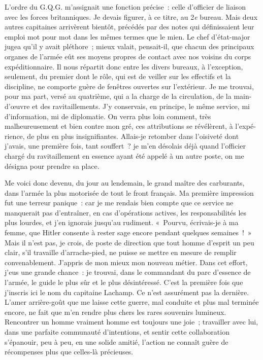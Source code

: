 \documentclass[french,twoside]{book} %
\begin{document}
L’ordre du G.Q.G. m’assignait une fonction précise : celle d’officier de liaison avec les forces britanniques. Je devais figurer, à ce titre, au 2\emph{e} bureau. Mais deux autres capitaines arrivèrent bientôt, pré­cédés par des notes qui définissaient leur emploi mot pour mot dans les mêmes termes que le mien. Le chef d’état-major jugea qu’il y avait   pléthore ; mieux valait, pensait-il, que chacun des principaux organes de l’armée eût ses moyens propres de contact avec nos voisins du corps expéditionnaire. Il nous répartit donc entre les divers bureaux, à l’exception, seulement, du premier dont le rôle, qui est de veiller sur les effectifs et la discipline, ne comporte guère de fenêtres ouvertes sur l’extérieur. Je me trouvai, pour ma part, versé au quatrième, qui a la charge de la circulation, de la main-d’œuvre et des ravitaille­ments. J’y conservais, en principe, le même service, mi d’information, mi de diplomatie. On verra plus loin comment, très malheureusement et bien contre mon gré, ces attributions se révélèrent, à l’expé­rience, de plus en plus insignifiantes. Allais-je retom­ber dans l’oisiveté dont j’avais, une première fois, tant souffert ? je m’en désolais déjà quand l’officier chargé du ravitaillement en essence ayant été appelé à un autre poste, on me désigna pour prendre sa place.\par
Me voici donc devenu, du jour au lendemain, le grand maître des carburants, dans l’armée la plus motorisée de tout le front français. Ma première impression fut une terreur panique : car je me rendais bien compte que ce service ne manquerait pas d’entraîner, en cas d’opérations actives, les responsabilités les plus lourdes, et j’en ignorais jusqu’au rudiment. « Pourvu, écrivais-je à ma femme, que Hitler consente à rester sage encore pendant quelques semaines ! » Mais il n’est pas, je crois, de poste de direction que tout homme d’esprit un peu clair, s’il travaille d’arrache-pied, ne puisse se mettre en mesure de remplir convenablement. J’appris de mon mieux mon nouveau métier. Dans cet effort, j’eus une grande chance : je trouvai, dans le commandant du parc d’essence de l’armée, le guide le plus sûr et le plus désintéressé. C’est la première fois que j’inscris ici le nom du capitaine Lachamp. Ce n’est assurément pas la dernière. L’amer   arrière-goût que me laisse cette guerre, mal conduite et plus mal terminée encore, ne fait que m’en rendre plus chers les rares souvenirs lumineux. Rencontrer un homme vraiment homme est toujours une joie ; travailler avec lui, dans une parfaite communauté d’intentions, et sentir cette collaboration s’épanouir, peu à peu, en une solide amitié, l’action ne connaît guère de récompenses plus que celles-là précieuses.\par
\end{document}
